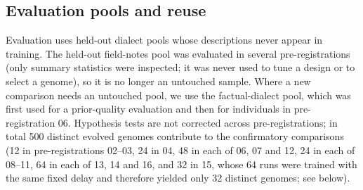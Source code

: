 \subsection{Evaluation pools and reuse}
Evaluation uses held-out dialect pools whose descriptions never appear in training. The held-out field-notes pool was evaluated in several pre-registrations (only summary statistics were inspected; it was never used to tune a design or to select a genome), so it is no longer an untouched sample. Where a new comparison needs an untouched pool, we use the factual-dialect pool, which was first used for a prior-quality evaluation and then for individuals in pre-registration 06. Hypothesis tests are not corrected across pre-registrations; in total 500 distinct evolved genomes contribute to the confirmatory comparisons (12 in pre-registrations 02--03, 24 in 04, 48 in each of 06, 07 and 12, 24 in each of 08--11, 64 in each of 13, 14 and 16, and 32 in 15, whose 64 runs were trained with the same fixed delay and therefore yielded only 32 distinct genomes; see below).
